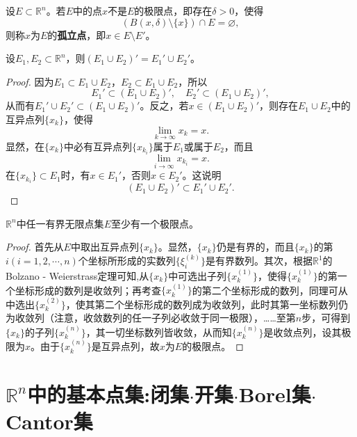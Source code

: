 \documentclass[lang=cn,newtx,10pt,scheme=chinese]{../Template/elegantbook}
\begin{document}
\begin{definition}[孤立点]\label{definition:孤立点}
  设\(E\subset\mathbb{R}^n\)。若\(E\)中的点\(x\)不是\(E\)的极限点，即存在\(\delta>0\)，使得
\[(B(x,\delta)\setminus\{x\})\cap E=\varnothing,\]
则称\(x\)为\(E\)的\textbf{孤立点}，即\(x\in E\setminus E'\)。
\end{definition}

\begin{theorem}[导集的性质]\label{theorem:导集的性质}
设\(E_1,E_2\subset\mathbb{R}^n\)，则\((E_1\cup E_2)' = E_1'\cup E_2'\)。
\end{theorem}
\begin{proof}
  因为\(E_1\subset E_1\cup E_2\)，\(E_2\subset E_1\cup E_2\)，所以
\[E_1'\subset (E_1\cup E_2)',\quad E_2'\subset (E_1\cup E_2)',\]
从而有\(E_1'\cup E_2'\subset (E_1\cup E_2)'\)。反之，若\(x\in (E_1\cup E_2)'\)，则存在\(E_1\cup E_2\)中的互异点列\(\{x_k\}\)，使得
\[\lim_{k\rightarrow\infty}x_k = x.\]
显然，在\(\{x_k\}\)中必有互异点列\(\{x_{k_i}\}\)属于\(E_1\)或属于\(E_2\)，而且
\[\lim_{i\rightarrow\infty}x_{k_i} = x.\]
在\(\{x_{k_i}\}\subset E_1\)时，有\(x\in E_1'\)，否则\(x\in E_2'\)。这说明
\[(E_1\cup E_2)'\subset E_1'\cup E_2'.\]
\end{proof}

\begin{theorem}\label{theorem:Bolzano - Weierstrass定理}
  \(\mathbb{R}^n\)中任一有界无限点集\(E\)至少有一个极限点。
\end{theorem}
\begin{proof}
  首先从\(E\)中取出互异点列\(\{x_k\}\)。显然，\(\{x_k\}\)仍是有界的，而且\(\{x_k\}\)的第\(i(i = 1,2,\cdots,n)\)个坐标所形成的实数列\(\{\xi_i^{(k)}\}\)是有界数列。其次，根据\(\mathbb{R}^1\)的Bolzano - Weierstrass定理可知,从\(\{x_k\}\)中可选出子列\(\{x_k^{(1)}\}\)，使得\(\{x_k^{(1)}\}\)的第一个坐标形成的数列是收敛列；再考查\(\{x_k^{(1)}\}\)的第二个坐标形成的数列，同理可从中选出\(\{x_k^{(2)}\}\)，使其第二个坐标形成的数列成为收敛列，此时其第一坐标数列仍为收敛列（注意，收敛数列的任一子列必收敛于同一极限），……至第\(n\)步，可得到\(\{x_k\}\)的子列\(\{x_k^{(n)}\}\)，其一切坐标数列皆收敛，从而知\(\{x_k^{(n)}\}\)是收敛点列，设其极限为\(x\)。由于\(\{x_k^{(n)}\}\)是互异点列，故\(x\)为\(E\)的极限点。
\end{proof}

\section{$\mathbb{R}^n$中的基本点集:闭集$\cdot$开集$\cdot$Borel集$\cdot$Cantor集}
\end{document}
